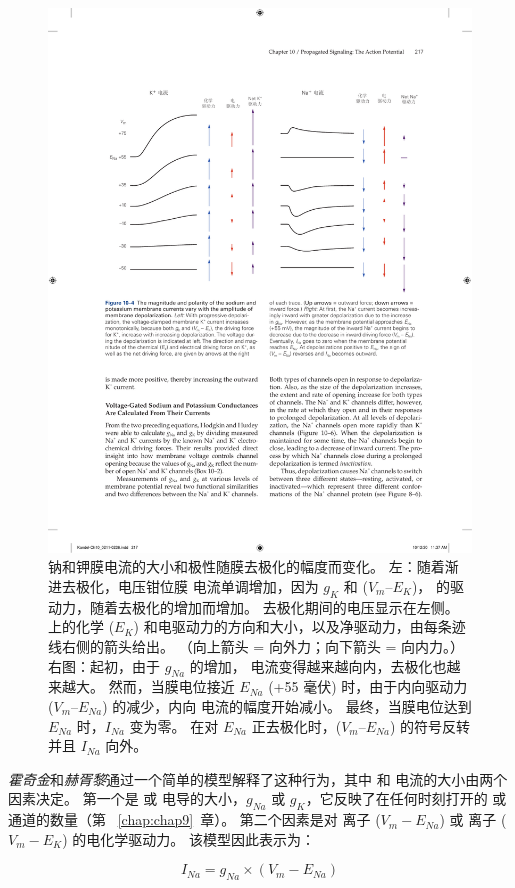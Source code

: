 \begin{figure}[htbp]
	\centering
	\includegraphics[width=0.8\linewidth]{chap10/fig_10_4}
	\caption{钠和钾膜电流的大小和极性随膜去极化的幅度而变化。
		左：随着渐进去极化，电压钳位膜  电流单调增加，因为 $g_K$ 和 ($V_m – E_K$)， 的驱动力，随着去极化的增加而增加。
		去极化期间的电压显示在左侧。
		 上的化学 ($E_K$) 和电驱动力的方向和大小，以及净驱动力，由每条迹线右侧的箭头给出。
		（向上箭头 = 向外力；向下箭头 = 向内力。）右图：起初，由于 $g_{Na}$ 的增加， 电流变得越来越向内，去极化也越来越大。
		然而，当膜电位接近 $E_{Na}$ (+55 毫伏) 时，由于内向驱动力 ($V_m – E_{Na}$) 的减少，内向  电流的幅度开始减小。
		最终，当膜电位达到 $E_{Na}$ 时，$I_{Na}$ 变为零。
		在对 $E_{Na}$ 正去极化时，($V_m – E_{Na}$) 的符号反转并且 $I_{Na}$ 向外。}
	\label{fig:10_4}
\end{figure}


\textit{霍奇金}和\textit{赫胥黎}通过一个简单的模型解释了这种行为，其中  和  电流的大小由两个因素决定。
第一个是  或  电导的大小，$g_{Na}$ 或 $g_K$，它反映了在任何时刻打开的  或  通道的数量（第 ~\ref{chap:chap9}~章）。
第二个因素是对  离子 ($V_m − E_{Na}$) 或  离子 ($V_m − E_K$) 的电化学驱动力。
该模型因此表示为：

\begin{equation}
	I_{Na} = g_{Na} \times (V_m - E_{Na})
\end{equation}

